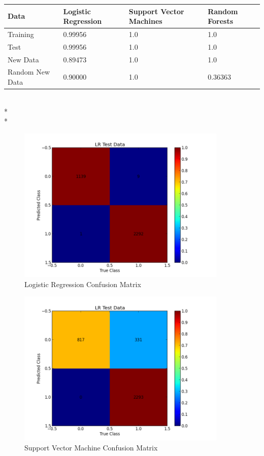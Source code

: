 \begin{minipage}{\linewidth}
\centering
{} \label{tab:title} 
\begin{tabular}[t]{ C{1.4in} *3{C{1.4in}}}\toprule[1.5pt]
\bf Data & \bf Logistic Regression & \bf Support Vector Machines & \bf Random Forests \\\midrule
Training        & 0.99956  & 1.0 & 1.0\\
Test        &  0.99956     & 1.0 & 1.0 \\
New Data        &  0.89473  & 1.0  & 1.0 \\
Random New Data & 0.90000 & 1.0 & 0.36363 \\ 
\bottomrule[1.25pt]
\end {tabular}\par
\bigskip
\end{minipage}\\*\\*

\begin{figure}[!h]
  \centering
\includegraphics[width=10cm]{LRCMTestData}
  \caption[Logistic Regression Confusion Matrix]
   {Logistic Regression Confusion Matrix}
\end{figure}

\begin{figure}[!h]
 \centering
\includegraphics[width=10cm]{SVMCMTestData}
  \caption[Support Vector Machine Confusion Matrix]
   {Support Vector Machine Confusion Matrix}
\end{figure}

